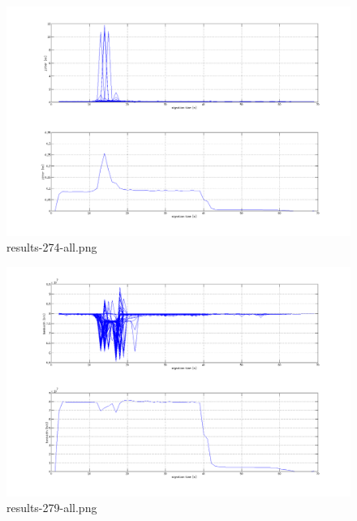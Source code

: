 \begin{figure}[htb]
	\begin{center}
	\includegraphics[width=\textwidth]{results-274-all.png}
	\end{center}
	\caption{results-274-all.png}
	\label{img:results-274-all.png}
\end{figure}
\begin{figure}[htb]
	\begin{center}
	\includegraphics[width=\textwidth]{results-279-all.png}
	\end{center}
	\caption{results-279-all.png}
	\label{img:results-279-all.png}
\end{figure}
